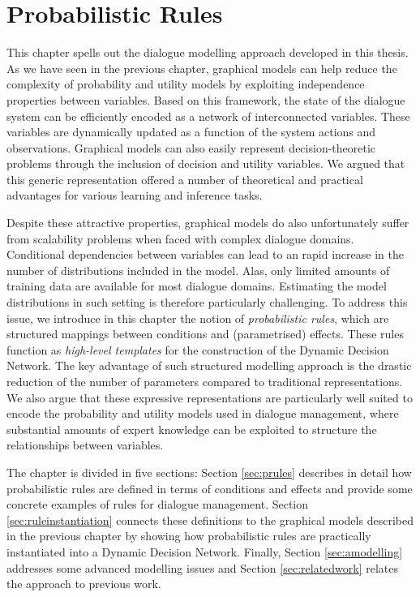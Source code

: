 \chapter{Probabilistic Rules}
\label{chap:rules}

This chapter spells out the dialogue modelling approach developed in this thesis.  As we have seen in the previous chapter, graphical models can help reduce the complexity of probability and utility models by exploiting independence properties between variables.  Based on this framework, the state of the dialogue system can be efficiently encoded as a network of interconnected variables.  These variables are dynamically updated as a function of the system actions and observations.  Graphical models can also easily represent decision-theoretic problems through the inclusion of decision and utility variables.  We argued that this generic representation offered a number of theoretical and practical advantages for various learning and inference tasks.

Despite these attractive properties, graphical models do also unfortunately suffer from scalability problems when faced with complex dialogue domains.  Conditional dependencies between variables can lead to an rapid increase in the number of distributions included in the model. Alas, only limited amounts of training data are available for most dialogue domains.  Estimating the model distributions in such setting is therefore particularly challenging. To address this issue, we introduce in this chapter the notion of \textit{probabilistic rules}, which are structured mappings between conditions and  (parametrised) effects.  These rules function as \textit{high-level templates} for the construction of the Dynamic Decision Network.  The key advantage of such structured modelling approach is the drastic reduction of the number of parameters compared to traditional representations.  We also argue that these expressive representations are particularly well suited to encode the probability and utility models used in dialogue management, where substantial amounts of expert knowledge can be exploited to structure the relationships between variables. 

The chapter is divided in five sections: Section \ref{sec:prules} describes in detail how probabilistic rules are defined in terms of conditions and effects and provide some concrete examples of rules for dialogue management.  Section \ref{sec:ruleinstantiation} connects these definitions to the graphical models described in the previous chapter by  showing how probabilistic rules are practically instantiated into a Dynamic Decision Network.  Finally, Section \ref{sec:amodelling} addresses some advanced modelling issues and Section \ref{sec:relatedwork} relates the approach to previous work.

